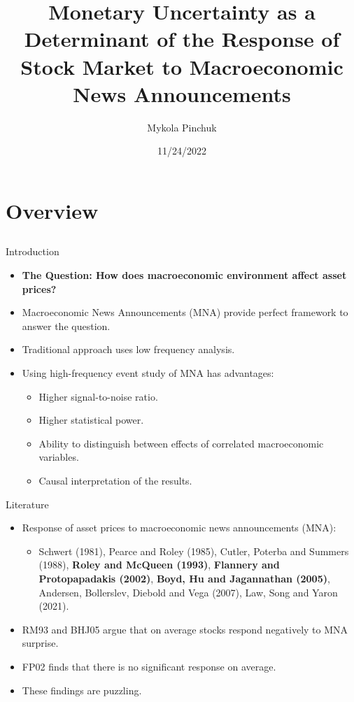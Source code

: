 \documentclass{beamer}
\title[Monetary Uncertainty as a Determinant of the Response of Stock Market to MNAs]{Monetary Uncertainty as a Determinant of the Response of Stock Market to Macroeconomic News Announcements\\ }
\author{Mykola Pinchuk}
\date{11/24/2022}
\begin{document}
\begin{frame}
  \titlepage
\end{frame}

\section{Overview}
\subsection{}


\begin{frame}{Introduction}
\begin{itemize}
    \item {\textbf{The Question: How does macroeconomic environment affect asset prices?}}
    \item {Macroeconomic News Announcements (MNA) provide perfect framework to answer the question.}    
    \item {Traditional approach uses low frequency analysis.}    
    \item {Using high-frequency event study of MNA has advantages:}
    \begin{itemize}
        \item {Higher signal-to-noise ratio.}
        \item {Higher statistical power.}
        \item {Ability to distinguish between effects of correlated macroeconomic variables.}
        \item {Causal interpretation of the results.}
    \end{itemize}
\end{itemize}
\end{frame}


\begin{frame}{Literature}
\begin{itemize}
    \item {Response of asset prices to macroeconomic news announcements (MNA):}
    \begin{itemize}
        \item {Schwert (1981), Pearce and Roley (1985), Cutler, Poterba and Summers (1988), \textbf{Roley and McQueen (1993)}, \textbf{Flannery and Protopapadakis (2002)}, \textbf{Boyd, Hu and Jagannathan (2005)}, Andersen, Bollerslev, Diebold and Vega (2007), Law, Song and Yaron (2021).}
    \end{itemize}
    \item {RM93 and BHJ05 argue that on average stocks respond negatively to MNA surprise.}
    \item {FP02 finds that there is no significant response on average.}
    \item {These findings are puzzling.}
\end{itemize}
\end{frame}
\end{document}
